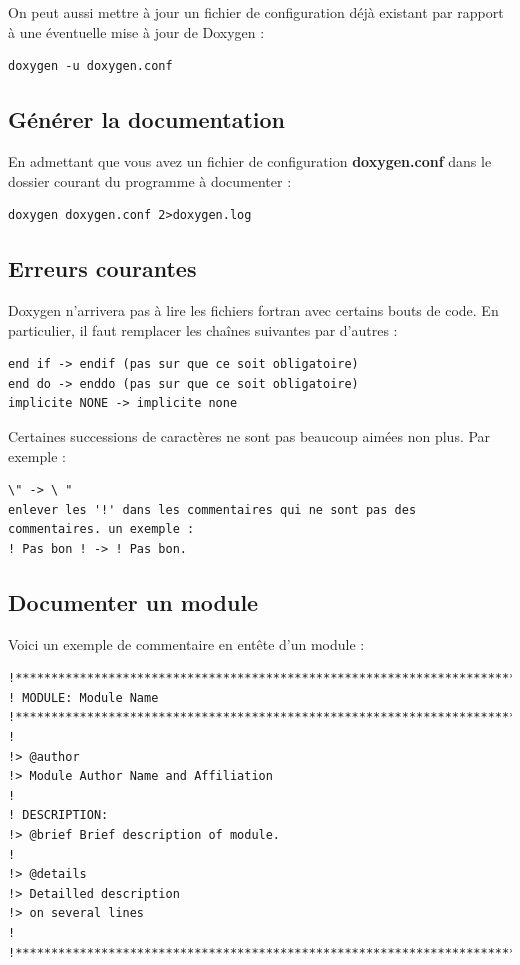 \documentclass[a4paper,twoside]{article}
\begin{document}
\bigskip

On peut aussi mettre à jour un fichier de configuration déjà existant par rapport à une éventuelle mise à jour de Doxygen : 
\begin{verbatim}
doxygen -u doxygen.conf
\end{verbatim}

\subsection{Générer la documentation}
En admettant que vous avez un fichier de configuration \textbf{doxygen.conf} dans le dossier courant du programme à documenter : 
\begin{verbatim}
doxygen doxygen.conf 2>doxygen.log
\end{verbatim}

\subsection{Erreurs courantes}
Doxygen n'arrivera pas à lire les fichiers fortran avec certains bouts de code. En particulier, il faut remplacer les chaînes suivantes par d'autres : 
\begin{verbatim}
end if -> endif (pas sur que ce soit obligatoire)
end do -> enddo (pas sur que ce soit obligatoire)
implicite NONE -> implicite none
\end{verbatim}

Certaines successions de caractères ne sont pas beaucoup aimées non plus. Par exemple : 
\begin{verbatim}
\" -> \ "
enlever les '!' dans les commentaires qui ne sont pas des commentaires. un exemple : 
! Pas bon ! -> ! Pas bon.
\end{verbatim}

\subsection{Documenter un module}
Voici un exemple de commentaire en entête d'un module : 
\begin{verbatim}
!******************************************************************************
! MODULE: Module Name
!******************************************************************************
!
!> @author
!> Module Author Name and Affiliation
!
! DESCRIPTION: 
!> @brief Brief description of module.
!
!> @details
!> Detailled description
!> on several lines
!
!******************************************************************************
\end{verbatim}
\end{document}
